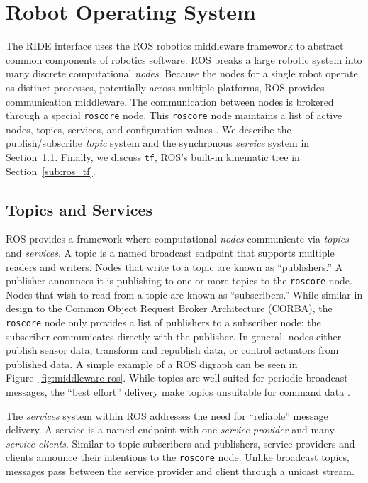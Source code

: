 
\section{Robot Operating System}
\label{sec:ros}
The RIDE interface uses the ROS robotics middleware framework to abstract common components of robotics software. ROS breaks a large robotic system into many discrete computational \emph{nodes}. Because the nodes for a single robot operate as distinct processes, potentially across multiple platforms, ROS provides communication middleware. The communication between nodes is brokered through a special \verb!roscore! node. This \verb!roscore! node maintains a list of active nodes, topics, services, and configuration values \cite{ROS09}. We describe the publish/subscribe \emph{topic} system and the synchronous \emph{service} system in Section~\ref{sub:ros_net}. Finally, we discuss \verb!tf!, ROS's built-in kinematic tree in Section~\ref{sub:ros_tf}.

\subsection{Topics and Services}
\label{sub:ros_net}
ROS provides a framework where computational \emph{nodes} communicate via \emph{topics} and \emph{services}. A topic is a named broadcast endpoint that supports multiple readers and writers. Nodes that write to a topic are known as ``publishers.'' A publisher announces it is publishing to one or more topics to the \verb!roscore! node. Nodes that wish to read from a topic are known as ``subscribers.'' While similar in design to the Common Object Request Broker Architecture (CORBA), the \verb!roscore! node only provides a list of publishers to a subscriber node; the subscriber communicates directly with the publisher. In general, nodes either publish sensor data, transform and republish data, or control actuators from published data. A simple example of a ROS digraph can be seen in Figure~\ref{fig:middleware-ros}. While topics are well suited for periodic broadcast messages, the ``best effort'' delivery make topics unsuitable for command data \cite{ROS09}.

The \emph{services} system within ROS addresses the need for ``reliable'' message delivery. A service is a named endpoint with one \emph{service provider} and many \emph{service clients}.  Similar to topic subscribers and publishers, service providers and clients announce their intentions to the \verb!roscore! node. Unlike broadcast topics, messages pass between the service provider and client through a unicast stream. 

